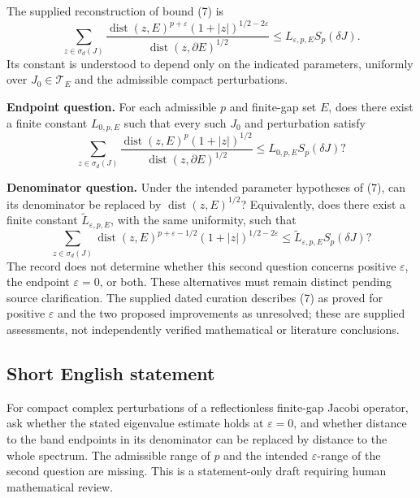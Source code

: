 \documentclass[11pt]{article}
\begin{document}
The supplied reconstruction of bound (7) is
\[
\sum_{z\in\sigma_d(J)}
\frac{\operatorname{dist}(z,E)^{p+\varepsilon}(1+|z|)^{1/2-2\varepsilon}}
{\operatorname{dist}(z,\partial E)^{1/2}}
\leq L_{\varepsilon,p,E}S_p(\delta J).
\tag{7}
\]
Its constant is understood to depend only on the indicated parameters, uniformly over \(J_0\in\mathcal T_E\) and the admissible compact perturbations.

\textbf{Endpoint question.} For each admissible \(p\) and finite-gap set \(E\), does there exist a finite constant \(L_{0,p,E}\) such that every such \(J_0\) and perturbation satisfy
\[
\sum_{z\in\sigma_d(J)}
\frac{\operatorname{dist}(z,E)^p(1+|z|)^{1/2}}
{\operatorname{dist}(z,\partial E)^{1/2}}
\leq L_{0,p,E}S_p(\delta J)?
\]

\textbf{Denominator question.} Under the intended parameter hypotheses of (7), can its denominator be replaced by \(\operatorname{dist}(z,E)^{1/2}\)? Equivalently, does there exist a finite constant \(\widetilde L_{\varepsilon,p,E}\), with the same uniformity, such that
\[
\sum_{z\in\sigma_d(J)}
\operatorname{dist}(z,E)^{p+\varepsilon-1/2}(1+|z|)^{1/2-2\varepsilon}
\leq\widetilde L_{\varepsilon,p,E}S_p(\delta J)?
\]
The record does not determine whether this second question concerns positive \(\varepsilon\), the endpoint \(\varepsilon=0\), or both. These alternatives must remain distinct pending source clarification. The supplied dated curation describes (7) as proved for positive \(\varepsilon\) and the two proposed improvements as unresolved; these are supplied assessments, not independently verified mathematical or literature conclusions.
\subsection{Short English statement}
For compact complex perturbations of a reflectionless finite-gap Jacobi operator, ask whether the stated eigenvalue estimate holds at \(\varepsilon=0\), and whether distance to the band endpoints in its denominator can be replaced by distance to the whole spectrum. The admissible range of \(p\) and the intended \(\varepsilon\)-range of the second question are missing. This is a statement-only draft requiring human mathematical review.
\end{document}
